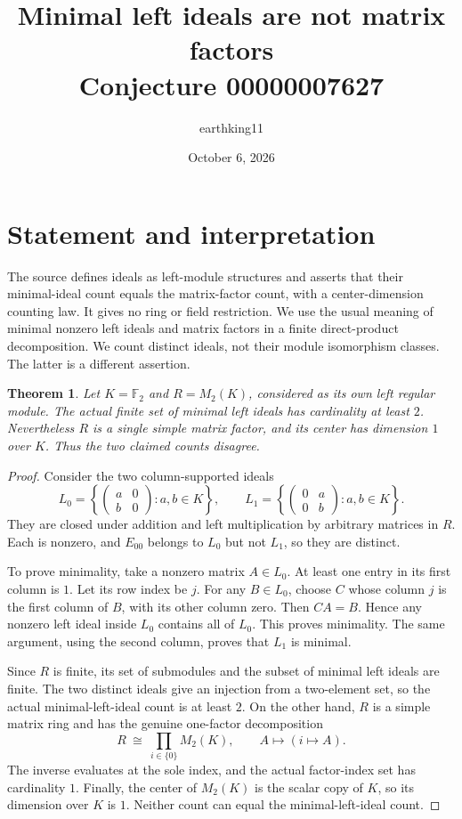 \documentclass[10pt]{article}
\title{Minimal left ideals are not matrix factors\\Conjecture 00000007627}
\author{earthking11}
\date{October 6, 2026}
\newtheorem{theorem}{Theorem}
\begin{document}
\maketitle
\section*{Statement and interpretation}
The source defines ideals as left-module structures and asserts that their
minimal-ideal count equals the matrix-factor count, with a center-dimension
counting law. It gives no ring or field restriction. We use the usual
meaning of minimal nonzero left ideals and matrix factors in a finite
direct-product decomposition. We count distinct ideals, not their module
isomorphism classes. The latter is a different assertion.

\begin{theorem}
Let $K=\mathbb F_2$ and $R=M_2(K)$, considered as its own left regular
module. The actual finite set of minimal left ideals has cardinality at
least $2$. Nevertheless $R$ is a single simple matrix factor, and its
center has dimension $1$ over $K$. Thus the two claimed counts disagree.
\end{theorem}
\begin{proof}
Consider the two column-supported ideals
\[
 L_0=\left\{\begin{pmatrix}a&0\\b&0\end{pmatrix}:a,b\in K\right\},
 \qquad
 L_1=\left\{\begin{pmatrix}0&a\\0&b\end{pmatrix}:a,b\in K\right\}.
\]
They are closed under addition and left multiplication by arbitrary
matrices in $R$. Each is nonzero, and $E_{00}$ belongs to $L_0$ but not
$L_1$, so they are distinct.

To prove minimality, take a nonzero matrix $A\in L_0$. At least one entry
in its first column is $1$. Let its row index be $j$. For any $B\in L_0$,
choose $C$ whose column $j$ is the first column of $B$, with its other
column zero. Then $CA=B$. Hence any nonzero left ideal inside $L_0$
contains all of $L_0$. This proves minimality. The same argument, using
the second column, proves that $L_1$ is minimal.

Since $R$ is finite, its set of submodules and the subset of minimal
left ideals are finite. The two distinct ideals give an injection from
a two-element set, so the actual minimal-left-ideal count is at least $2$.
On the other hand, $R$ is a simple matrix ring and has the genuine
one-factor decomposition
\[
 R\ \cong\ \prod_{i\in\{0\}} M_2(K),
 \qquad A\longmapsto (i\longmapsto A).
\]
The inverse evaluates at the sole index, and the actual factor-index
set has cardinality $1$. Finally, the center of $M_2(K)$ is the scalar
copy of $K$, so its dimension over $K$ is $1$. Neither count can equal
the minimal-left-ideal count.
\end{proof}
\end{document}
